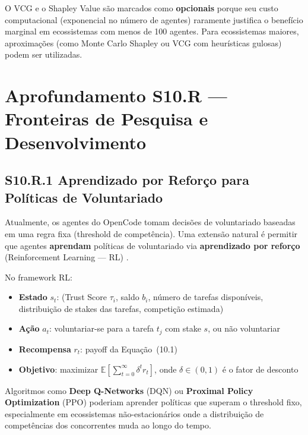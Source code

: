 O VCG e o Shapley Value são marcados como \textbf{opcionais} porque seu custo computacional (exponencial no número de agentes) raramente justifica o benefício marginal em ecossistemas com menos de 100 agentes. Para ecossistemas maiores, aproximações (como Monte Carlo Shapley ou VCG com heurísticas gulosas) podem ser utilizadas.


\section*{Aprofundamento S10.R --- Fronteiras de Pesquisa e Desenvolvimento}

\subsection*{S10.R.1 Aprendizado por Reforço para Políticas de Voluntariado}

Atualmente, os agentes do OpenCode tomam decisões de voluntariado baseadas em uma regra fixa (threshold de competência). Uma extensão natural é permitir que agentes \textbf{aprendam} políticas de voluntariado via \textbf{aprendizado por reforço} (Reinforcement Learning --- RL) \cite{sutton2018reinforcement}.

No framework RL:
\begin{itemize}
    \item \textbf{Estado} $s_t$: (Trust Score $\tau_i$, saldo $b_i$, número de tarefas disponíveis, distribuição de stakes das tarefas, competição estimada)
    \item \textbf{Ação} $a_t$: voluntariar-se para a tarefa $t_j$ com stake $s$, ou não voluntariar
    \item \textbf{Recompensa} $r_t$: payoff da Equação~(10.1)
    \item \textbf{Objetivo}: maximizar $\mathbb{E}[\sum_{t=0}^{\infty} \delta^t r_t]$, onde $\delta \in (0,1)$ é o fator de desconto
\end{itemize}

Algoritmos como \textbf{Deep Q-Networks} (DQN) ou \textbf{Proximal Policy Optimization} (PPO) poderiam aprender políticas que superam o threshold fixo, especialmente em ecossistemas não-estacionários onde a distribuição de competências dos concorrentes muda ao longo do tempo.

